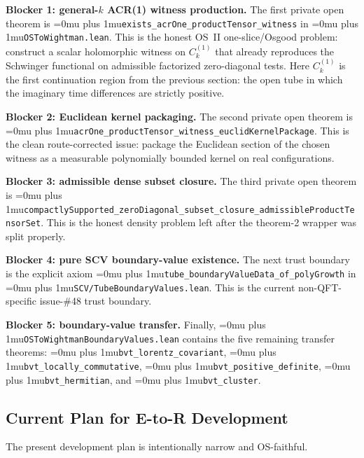 \documentclass[11pt,a4paper]{article}
\newcommand{\leanfile}[1]{\begingroup\Urlmuskip=0mu plus 1mu\relax\nolinkurl{#1}\endgroup}
\newcommand{\leanname}[1]{\begingroup\Urlmuskip=0mu plus 1mu\relax\nolinkurl{#1}\endgroup}
\begin{document}
\medskip\noindent
\textbf{Blocker 1: general-$k$ ACR(1) witness production.}
The first private open theorem is
\leanname{exists\_acrOne\_productTensor\_witness} in
\leanfile{OSToWightman.lean}. This is the honest OS~II one-slice/Osgood problem:
construct a scalar holomorphic witness on \(C_k^{(1)}\) that already reproduces
the Schwinger functional on admissible factorized zero-diagonal tests. Here
\(C_k^{(1)}\) is the first continuation region from the previous section: the
open tube in which the imaginary time differences are strictly positive.

\medskip\noindent
\textbf{Blocker 2: Euclidean kernel packaging.}
The second private open theorem is
\leanname{acrOne\_productTensor\_witness\_euclidKernelPackage}. This is the
clean route-corrected issue: package the Euclidean section of the chosen witness
as a measurable polynomially bounded kernel on real configurations.

\medskip\noindent
\textbf{Blocker 3: admissible dense subset closure.}
The third private open theorem is
\leanname{compactlySupported\_zeroDiagonal\_subset\_closure\_admissibleProductTensorSet}.
This is the honest density problem left after the theorem-2 wrapper was split
properly.

\medskip\noindent
\textbf{Blocker 4: pure SCV boundary-value existence.}
The next trust boundary is the explicit axiom
\leanname{tube\_boundaryValueData\_of\_polyGrowth} in
\leanfile{SCV/TubeBoundaryValues.lean}. This is the current non-QFT-specific
issue-\#48 trust boundary.

\medskip\noindent
\textbf{Blocker 5: boundary-value transfer.}
Finally, \leanfile{OSToWightmanBoundaryValues.lean} contains the five remaining
transfer theorems:
\leanname{bvt\_lorentz\_covariant},
\leanname{bvt\_locally\_commutative},
\leanname{bvt\_positive\_definite},
\leanname{bvt\_hermitian}, and
\leanname{bvt\_cluster}.

\subsection{Current Plan for E-to-R Development}

The present development plan is intentionally narrow and OS-faithful.
\end{document}
